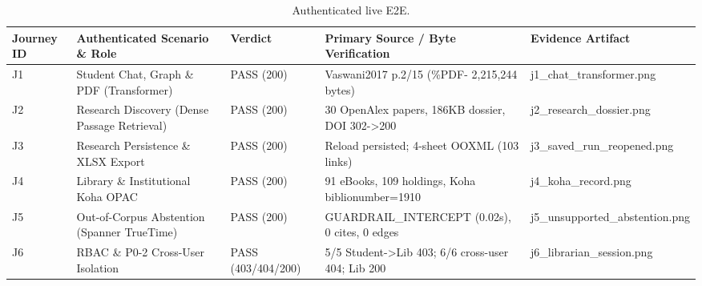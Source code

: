 \begin{table}[t]
\centering
\caption{Authenticated live E2E.}
\label{tab:t6_hosted_e2e}
\small
\begin{tabular}{@{}lllll@{}}
\toprule
\textbf{Journey ID} & \textbf{Authenticated Scenario \& Role} & \textbf{Verdict} & \textbf{Primary Source / Byte Verification} & \textbf{Evidence Artifact} \\
\midrule
J1 & Student Chat, Graph \& PDF (Transformer) & PASS (200) & Vaswani2017 p.2/15 (\%PDF- 2,215,244 bytes) & j1\_chat\_transformer.png \\
J2 & Research Discovery (Dense Passage Retrieval) & PASS (200) & 30 OpenAlex papers, 186KB dossier, DOI 302->200 & j2\_research\_dossier.png \\
J3 & Research Persistence \& XLSX Export & PASS (200) & Reload persisted; 4-sheet OOXML (103 links) & j3\_saved\_run\_reopened.png \\
J4 & Library \& Institutional Koha OPAC & PASS (200) & 91 eBooks, 109 holdings, Koha biblionumber=1910 & j4\_koha\_record.png \\
J5 & Out-of-Corpus Abstention (Spanner TrueTime) & PASS (200) & GUARDRAIL\_INTERCEPT (0.02s), 0 cites, 0 edges & j5\_unsupported\_abstention.png \\
J6 & RBAC \& P0-2 Cross-User Isolation & PASS (403/404/200) & 5/5 Student->Lib 403; 6/6 cross-user 404; Lib 200 & j6\_librarian\_session.png \\
\bottomrule
\end{tabular}
\end{table}

